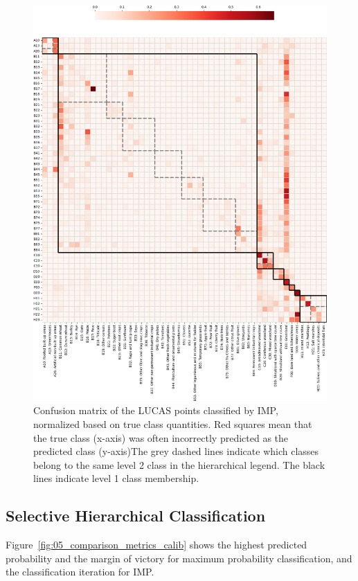     \begin{figure}[H]
        \centering
        \includegraphics[width=\textwidth]{figs_05/fig_hierarchical_confusion_matrix_lucas.png}
        \caption{Confusion matrix of the LUCAS points classified by IMP, normalized based on true class quantities. Red squares mean that the true class (x-axis) was often incorrectly predicted as the predicted class (y-axis)The grey dashed lines indicate which classes belong to the same level 2 class in the hierarchical legend. The black lines indicate level 1 class membership.}
        \label{fig:05_confusion_matrix_lucas}
    \end{figure}

    \subsection{Selective Hierarchical Classification}

        Figure~\ref{fig:05_comparison_metrics_calib} shows the highest predicted probability and the margin of victory for maximum probability classification, and the classification iteration for IMP.
        
